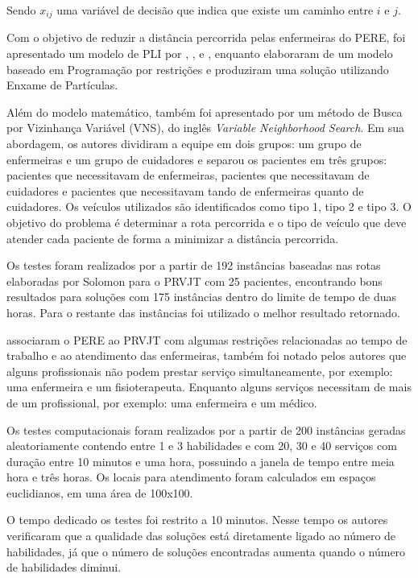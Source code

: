 Sendo $x_{ij}$ uma variável de decisão que indica que existe um caminho entre $i$ e $j$.

Com o objetivo de reduzir a distância percorrida pelas enfermeiras do \ac{PERE}, foi apresentado um modelo de  \ac{PLI} por , , \cite{Decerle:2016} e , enquanto  elaboraram de um modelo baseado em Programação por restrições e  produziram uma solução utilizando Enxame de Partículas. 

Além do modelo matemático, também foi apresentado por  um método de Busca por Vizinhança Variável (VNS), do inglês \textit{Variable Neighborhood Search}. 
Em sua abordagem, os autores dividiram a equipe em dois grupos: um grupo de enfermeiras e um grupo de cuidadores e separou os pacientes em três grupos: pacientes que necessitavam de enfermeiras, pacientes que necessitavam de cuidadores e pacientes que necessitavam tando de enfermeiras quanto de cuidadores.
Os veículos utilizados são identificados como tipo 1, tipo 2 e tipo 3.
O objetivo do problema é determinar a rota percorrida e o tipo de veículo que deve atender cada paciente de forma a minimizar a distância percorrida.

Os testes foram realizados por  a partir de 192 instâncias baseadas nas rotas elaboradas por Solomon para o \ac{PRVJT} com 25 pacientes, encontrando bons resultados para soluções com 175 instâncias dentro do limite de tempo de duas horas. Para o restante das instâncias foi utilizado o melhor resultado retornado.

 associaram o \ac{PERE} ao \ac{PRVJT} com algumas restrições relacionadas ao tempo de trabalho e ao atendimento das enfermeiras, também foi notado pelos autores que alguns profissionais não podem prestar serviço simultaneamente, por exemplo: uma enfermeira e um fisioterapeuta. Enquanto alguns serviços necessitam de mais de um profissional, por exemplo: uma enfermeira e um médico. 

Os testes computacionais foram realizados por  a partir de 200 instâncias geradas aleatoriamente contendo entre 1 e 3 habilidades e com 20, 30 e 40 serviços com duração entre 10 minutos e uma hora, possuindo a janela de tempo entre meia hora e três horas. Os locais para atendimento foram calculados em espaços euclidianos, em uma área de 100x100. 

O tempo dedicado os testes foi restrito a 10 minutos. Nesse tempo os autores verificaram que a qualidade das soluções está diretamente ligado ao número de habilidades, já que o número de soluções encontradas aumenta quando o número de habilidades diminui.

